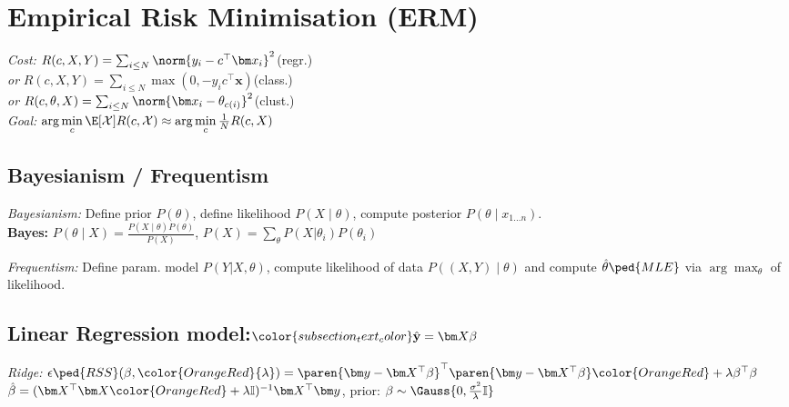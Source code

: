 \section{Empirical Risk Minimisation (ERM)}
\emph{Cost:}\enspace
$R(c,X,Y) = \sum_{i\leq N} \norm{y_i - c^\top \bm x_i}^2$\quad(regr.)\\
\quad\textit{or}\quad
$R(c,X,Y) = \sum_{i\leq N} \max(0, -y_i c^\top \bm x)$\quad (class.)\\
\quad\textit{or}\quad
$R(c,\theta,X) = \sum_{i\leq N} \norm{\bm x_i - \theta_{c(i)}}^2$\quad (clust.)\\
\emph{Goal:}\enspace
$\arg\min\limits_c \E[\mathcal{X}]{ R(c,\mathcal{X}) } \approx \arg\min\limits_c \frac1N R(c, X)$
\iftrue
    \subsection{Bayesianism / Frequentism}

    \emph{Bayesianism:}\enspace
    Define prior $P(\theta)$, define likelihood $P(X\mid\theta)$, compute posterior $P(\theta\mid x_{1...n})$.
    \\
    \textbf{Bayes:}\enspace
    $P(\theta\mid X) = \frac{P(X\mid\theta)P(\theta)}{P(X)}$,
    {\footnotesize $P(X) {=} \sum_\theta P(X\vert\theta_i) P(\theta_i)$}

    \emph{Frequentism:}\enspace
    Define param. model $P(Y\vert X,\theta)$, compute likelihood of data $P((X,Y)\mid\theta)$ and compute $\hat\theta\ped{MLE}$ via $\arg\max_\theta$ of likelihood.

    \subsection{Linear Regression
    \hfill{\normalfont\sffamily model:\enspace $\color{subsection_text_color} \hat{\mathbf y} = \bm X \beta$}}

    \emph{Ridge:}\enspace
    $\epsilon\ped{RSS}(\beta,{\color{OrangeRed}{\lambda}}) = \paren{\bm y - \bm X^\top \beta}^\top \paren{\bm y - \bm X^\top \beta} \color{OrangeRed} + \lambda \beta^\top \beta$ \\\quad
    $\hat\beta = (\bm X^\top \bm X {\color{OrangeRed} + \lambda \mathbb I})^{-1} \bm X^\top \bm y$,
    \quad prior: $\beta \sim \Gauss{0, \frac{\sigma^2}{\lambda} \mathbb I}$

